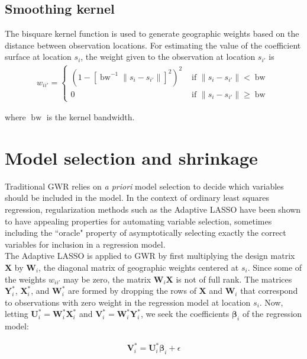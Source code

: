 \documentclass[authoryear, review, 11pt]{elsarticle}
\DeclareMathOperator*{\bw}{\mbox{bw}}
\begin{document}
	 
	 \subsection{Smoothing kernel}
	 	The bisquare kernel function is used to generate geographic weights based on the distance between observation locations. For estimating the value of the coefficient surface at location $s_i$, the weight given to the observation at location $s_{i'}$ is	
	\begin{eqnarray}
		w_{ii'} = \begin{cases} \left( 1-\left[ \bw^{-1} \|s_i-s_{i'}\| \right]^2 \right)^2 & \mbox{ if } \|s_i-s_{i'}\| < \bw \\ 0 & \mbox{ if } \|s_i-s_{i'}\| \geq \bw \end{cases}
	\end{eqnarray}
	
	where $\bw$ is the kernel bandwidth.\\
	
\section{Model selection and shrinkage \label{section:method}}
	Traditional GWR relies on \emph{a priori} model selection to decide which variables should be included in the model. In the context of ordinary least squares regression, regularization methods such as the Adaptive LASSO \citep{Zou:2006} have been shown to have appealing properties for automating variable selection, sometimes including the ``oracle" property of asymptotically selecting exactly the correct variables for inclusion in a regression model.\\
	
	The Adaptive LASSO is applied to GWR by first multiplying the design matrix $\bm{X}$ by $\bm{W}_i$, the diagonal matrix of geographic weights centered at $s_i$. Since some of the weights $w_{ii'}$ may be zero, the matrix $\bm{W}_i\bm{X}$ is not of full rank. The matrices $\bm{Y}_i^*$, $\bm{X}_i^*$, and $\bm{W}_i^*$ are formed by dropping the rows of $\bm{X}$  and $\bm{W}_i$ that correspond to observations with zero weight in the regression model at location $s_i$. Now, letting $\bm{U}_i^* = \bm{W}_i^* \bm{X}_i^*$ and $\bm{V}_i^* = \bm{W}_i^* \bm{Y}_i^*$, we seek the coefficients $\bm{\beta}_i$ of the regression model:
	
	\begin{eqnarray}
		\bm{V}_i^* = \bm{U}_i^* \bm{\beta}_i + \epsilon
	\end{eqnarray}
	
\end{document}
